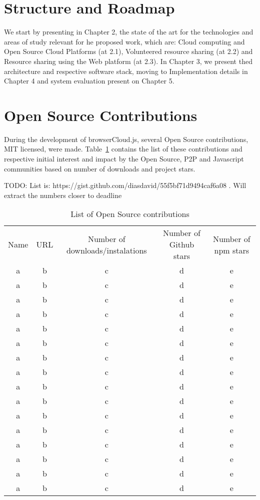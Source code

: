 \section{Structure and Roadmap}

We start by presenting in Chapter 2, the state of the art for the technologies and areas of study relevant for he proposed work, which are: Cloud computing and Open Source Cloud Platforms (at 2.1), Volunteered resource sharing (at 2.2) and Resource sharing using the Web platform (at 2.3). In Chapter 3, we present thed architecture and respective software stack, moving to Implementation details in Chapter 4 and system evaluation present on Chapter 5.

\section{Open Source Contributions}

During the development of browserCloud.js, several Open Source contributions, MIT licensed, were made. Table~\ref{tbl:codecontributions} contains the list of these contributions and respective initial interest and impact by the Open Source, P2P and Javascript communities based on number of downloads and project stars.


TODO: List is: https://gist.github.com/diasdavid/55f5bf71d9494caf6a08 . Will extract the numbers closer to deadline

\begin{table}
  \centering
  \begin{tabular}{| c | c | c | c | c |}
  \hline 
  Name & URL & Number of downloads/instalations & Number of Github stars & Number of npm stars  \\
  a & b & c & d & e \\
  a & b & c & d & e \\
  a & b & c & d & e \\
  a & b & c & d & e \\
  a & b & c & d & e \\
  a & b & c & d & e \\
  a & b & c & d & e \\
  a & b & c & d & e \\
  a & b & c & d & e \\
  a & b & c & d & e \\
  a & b & c & d & e \\
  a & b & c & d & e \\
  a & b & c & d & e \\
  a & b & c & d & e \\
  a & b & c & d & e \\
  a & b & c & d & e \\
  \hline   
  \end{tabular}
  \caption{List of Open Source contributions}
  \label{tbl:codecontributions}
\end{table}


